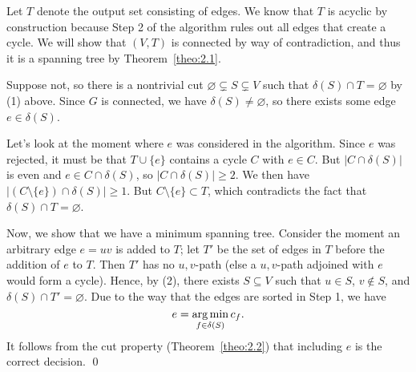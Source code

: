 \begin{pf}
    Let $T$ denote the output set consisting of edges. We know that $T$ is 
    acyclic by construction because Step 2 of the algorithm rules 
    out all edges that create a cycle. We will show that $(V, T)$ is 
    connected by way of contradiction, and thus it is a spanning tree 
    by Theorem~\ref{theo:2.1}.

    Suppose not, so there is a nontrivial cut $\varnothing \subsetneq S 
    \subsetneq V$ such that $\delta(S) \cap T = \varnothing$ by (1) above. 
    Since $G$ is connected, we have $\delta(S) \neq \varnothing$, so 
    there exists some edge $e \in \delta(S)$. 

    Let's look at the moment where $e$ was considered in the algorithm. 
    Since $e$ was rejected, it must be that $T \cup \{e\}$ contains a cycle 
    $C$ with $e \in C$. But $|C \cap \delta(S)|$ is even and $e \in 
    C \cap \delta(S)$, so $|C \cap \delta(S)| \geq 2$. We then have 
    $|(C \setminus \{e\}) \cap \delta(S)| \geq 1$. But $C \setminus \{e\} 
    \subset T$, which contradicts the fact that $\delta(S) \cap T = \varnothing$. 

    Now, we show that we have a minimum spanning tree. Consider the moment 
    an arbitrary edge $e = uv$ is added to $T$; let $T'$ be the set of edges 
    in $T$ before the addition of $e$ to $T$. Then $T'$ has no $u, v$-path 
    (else a $u, v$-path adjoined with $e$ would form a cycle). Hence, 
    by (2), there exists $S \subseteq V$ such that $u \in S$, $v \notin S$, 
    and $\delta(S) \cap T' = \varnothing$. Due to the way that the edges 
    are sorted in Step 1, we have 
    \[ e = \operatorname*{arg\,min}_{f\in\delta(S)} c_f. \] 
    It follows from the cut property (Theorem~\ref{theo:2.2}) that including 
    $e$ is the correct decision. \qed
\end{pf}\vspace{-0.25cm}

